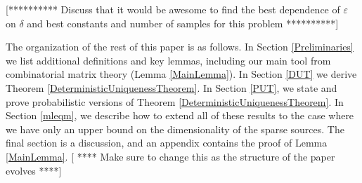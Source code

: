 \documentclass[journal, onecolumn]{IEEEtran}
\begin{document}
[********** Discuss that it would be awesome to find the best dependence of $\varepsilon$ on $\delta$ and best constants and number of samples for this problem **********]

The organization of the rest of this paper is as follows. In Section \ref{Preliminaries} we list additional definitions and key lemmas, including our main tool from combinatorial matrix theory (Lemma \ref{MainLemma}). In Section \ref{DUT} we derive Theorem \ref{DeterministicUniquenessTheorem}. In Section \ref{PUT}, we state and prove probabilistic versions of Theorem \ref{DeterministicUniquenessTheorem}. In Section \ref{mleqm}, we describe how to extend all of these results to the case where we have only an upper bound on the dimensionality of the sparse sources. The final section is a discussion, and an appendix contains the proof of Lemma \ref{MainLemma}.
[ **** Make sure to change this as the structure of the paper evolves ****]
\end{document}
